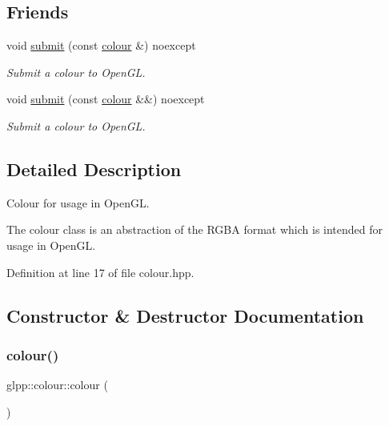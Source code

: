 \subsection*{Friends}
\begin{DoxyCompactItemize}
\item 
void \hyperlink{classglpp_1_1colour_af5ae9d62acf85a32b5e416b45ba5db4b}{submit} (const \hyperlink{classglpp_1_1colour}{colour} \&) noexcept
\begin{DoxyCompactList}\small\item\em Submit a colour to Open\+GL. \end{DoxyCompactList}\item 
void \hyperlink{classglpp_1_1colour_a2d8abc29cef9c846af119655c4b65f4c}{submit} (const \hyperlink{classglpp_1_1colour}{colour} \&\&) noexcept
\begin{DoxyCompactList}\small\item\em Submit a colour to Open\+GL. \end{DoxyCompactList}\end{DoxyCompactItemize}


\subsection{Detailed Description}
Colour for usage in Open\+GL. 

The colour class is an abstraction of the R\+G\+BA format which is intended for usage in Open\+GL. 

Definition at line 17 of file colour.\+hpp.



\subsection{Constructor \& Destructor Documentation}
\mbox{\label{classglpp_1_1colour_a2b813162a97051ad40d439a631b56fb1}} 
\subsubsection{\texorpdfstring{colour()}{colour()}\hspace{0.1cm}{\footnotesize\ttfamily [1/2]}}
{\footnotesize\ttfamily glpp\+::colour\+::colour (\begin{DoxyParamCaption}{ }\end{DoxyParamCaption})\hspace{0.3cm}{\ttfamily [delete]}}

